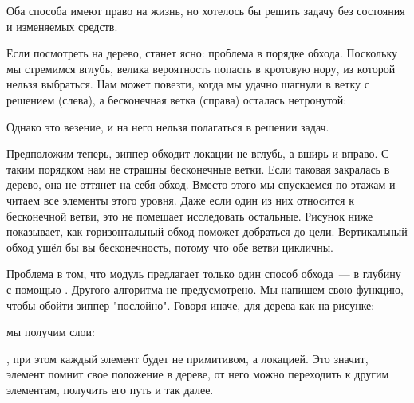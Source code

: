 Оба способа имеют право на жизнь, но хотелось бы решить задачу без состояния и
изменяемых средств.

Если посмотреть на дерево, станет ясно: проблема в порядке обхода. Поскольку мы
стремимся вглубь, велика вероятность попасть в кротовую нору, из которой нельзя
выбраться. Нам может повезти, когда мы удачно шагнули в ветку с решением
(слева), а бесконечная ветка (справа) осталась нетронутой:

\begin{figure}[H]
  \centering
  
  \label{fig:chart-zip-20}
\end{figure}

Однако это везение, и на него нельзя полагаться в решении задач.

Предположим теперь, зиппер обходит локации не вглубь, а вширь и вправо. С таким
порядком нам не страшны бесконечные ветки. Если таковая закралась в дерево, она
не оттянет на себя обход. Вместо этого мы спускаемся по этажам и читаем все
элементы этого уровня. Даже если один из них относится к бесконечной ветви, это
не помешает исследовать остальные. Рисунок ниже показывает, как горизонтальный
обход поможет добраться до цели. Вертикальный обход ушёл бы вы бесконечность,
потому что обе ветви цикличны.

\begin{figure}[H]
  \centering
  
  \label{fig:chart-zip-21}
\end{figure}

Проблема в том, что модуль  предлагает только один способ обхода~---
в глубину с помощью . Другого алгоритма не предусмотрено. Мы напишем
свою функцию, чтобы обойти зиппер "послойно". Говоря иначе, для дерева как на
рисунке:

\begin{figure}[H]
  \centering
  
  \label{fig:chart-zip-22}
\end{figure}

\noindent
мы получим слои:

\begin{english}
  \begin{clojure}
[1]
[2 3]
[4 5 6 7]
  \end{clojure}
\end{english}

\noindent
, при этом каждый элемент будет не примитивом, а локацией. Это значит, элемент
помнит свое положение в дереве, от него можно переходить к другим элементам,
получить его путь и так далее.

